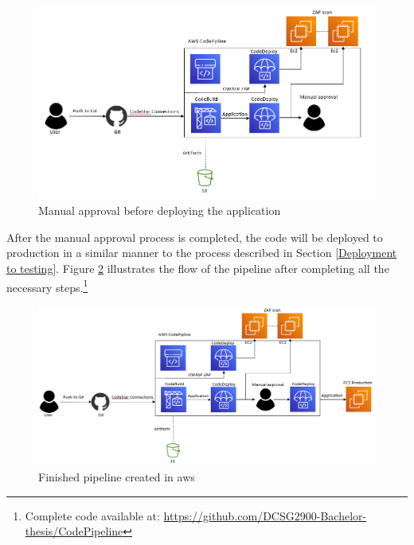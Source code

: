 \vspace{2mm}
\begin{figure}[H]
    \centering
    \includegraphics[width=0.8\columnwidth]{Images/aws-piplin-6.png}
    \caption{Manual approval before deploying the application}
    \label{fig: Manual approval before deploying the application}
\end{figure}
\newpage

After the manual approval process is completed, the code will be deployed to production in a similar manner to the process described in Section \ref{Deployment to testing}. Figure \ref{fig: Finished pipeline created in AWS} illustrates the flow of the pipeline after completing all the necessary steps.\footnote{Complete code available at: \url{https://github.com/DCSG2900-Bachelor-thesis/CodePipeline}}

\vspace{2mm}
\begin{figure}[H]
    \centering
    \includegraphics[width=0.8\columnwidth]{Images/aws-piplin-7.png}
    \caption{Finished pipeline created in \acrshort{aws}}
    \label{fig: Finished pipeline created in AWS}
\end{figure}